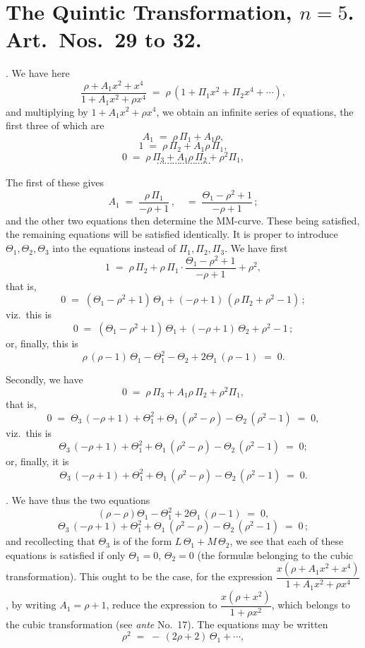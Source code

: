 \documentclass[11pt]{article}
\begin{document}
\bigskip

\section*{The Quintic Transformation, $n=5$. Art.\ Nos.\ 29 to 32.}

. We have here
\[
\frac{\rho + A_1 x^2 + x^4}{1 + A_1 x^2 + \rho x^4} \;=\; \rho\,(1 + \Pi_1 x^2 + \Pi_2 x^4 + \cdots),
\]
and multiplying by $1 + A_1 x^2 + \rho x^4$, we obtain an infinite series of equations, the first three of which are
\[
A_1 \;=\; \rho\,\Pi_1 + A_1\rho,
\]
\[
1 \;=\; \rho\,\Pi_2 + A_1\rho\,\Pi_1,
\]
\[
0 \;=\; \rho\,\Pi_3 + A_1\rho\,\Pi_2 + \rho^2\Pi_1,
\]
\[
\cdots\cdots\cdots\cdots\cdots\cdots\cdots
\]

\newpage

\noindent The first of these gives
\[
A_1 \;=\; \frac{\rho\,\Pi_1}{-\rho + 1}\,,\quad =\;\frac{\Theta_1 - \rho^2 + 1}{-\rho + 1}\,;
\]
and the other two equations then determine the MM-curve. These being satisfied, the remaining equations will be satisfied identically. It is proper to introduce $\Theta_1, \Theta_2, \Theta_3$ into the equations instead of $\Pi_1, \Pi_2, \Pi_3$. We have first
\[
1 \;=\; \rho\,\Pi_2 + \rho\,\Pi_1\cdot\frac{\Theta_1 - \rho^2 + 1}{-\rho + 1} + \rho^2,
\]
that is,
\[
0 \;=\; (\Theta_1 - \rho^2 + 1)\,\Theta_1 + (-\rho + 1)\,(\rho\,\Pi_2 + \rho^2 - 1)\,;
\]
viz.\ this is
\[
0 \;=\; (\Theta_1 - \rho^2 + 1)\,\Theta_1 + (-\rho + 1)\,\Theta_2 + \rho^2 - 1\,;
\]
or, finally, this is
\[
\rho\,(\rho - 1)\,\Theta_1 - \Theta_1^2 - \Theta_2 + 2\Theta_1\,(\rho - 1) \;=\; 0.
\]

\medskip

\noindent Secondly, we have
\[
0 \;=\; \rho\,\Pi_3 + A_1\rho\,\Pi_2 + \rho^2\Pi_1,
\]
that is,
\[
0 \;=\; \Theta_3\,(-\rho + 1) + \Theta_1^2 + \Theta_1\,(\rho^2 - \rho) - \Theta_2\,(\rho^2 - 1) \;=\; 0,
\]
viz.\ this is
\[
\Theta_3\,(-\rho + 1) + \Theta_1^2 + \Theta_1\,(\rho^2 - \rho) - \Theta_2\,(\rho^2 - 1) \;=\; 0;
\]
or, finally, it is
\[
\Theta_3\,(-\rho + 1) + \Theta_1^2 + \Theta_1\,(\rho^2 - \rho) - \Theta_2\,(\rho^2 - 1) \;=\; 0.
\]

\medskip

. We have thus the two equations
\[
(\rho - \rho)\Theta_1 - \Theta_1^2 + 2\Theta_1\,(\rho - 1) \;=\; 0,
\]
\[
\Theta_3\,(-\rho + 1) + \Theta_1^2 + \Theta_1\,(\rho^2 - \rho) - \Theta_2\,(\rho^2 - 1) \;=\; 0\,;
\]
and recollecting that $\Theta_3$ is of the form $L\,\Theta_1 + M\,\Theta_2$, we see that each of these equations is satisfied if only $\Theta_1 = 0$, $\Theta_2 = 0$ (the formul\ae{} belonging to the cubic transformation). This ought to be the case, for the expression $\dfrac{x(\rho + A_1 x^2 + x^4)}{1 + A_1 x^2 + \rho x^4}$, by writing $A_1 = \rho + 1$, reduce the expression to $\dfrac{x(\rho + x^2)}{1 + \rho x^2}$, which belongs to the cubic transformation (see \textit{ante} No.~17). The equations may be written
\[
\rho^2 \;=\; -\,(2\rho + 2)\,\Theta_1 + \cdots,
\]
\end{document}
